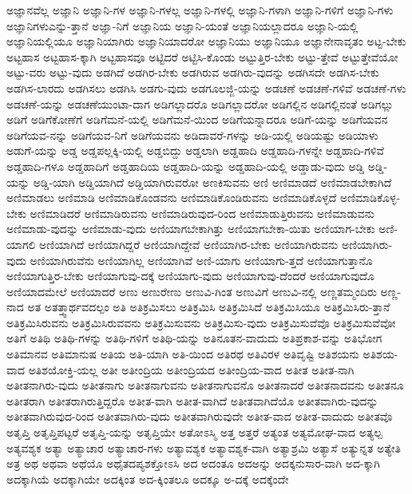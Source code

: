 {ಅಜ್ಞಾನವೆಲ್ಲ
ಅಜ್ಞಾನಿ
ಅಜ್ಞಾನಿ-ಗಳ
ಅಜ್ಞಾನಿ-ಗಳಲ್ಲ
ಅಜ್ಞಾನಿ-ಗಳಲ್ಲಿ
ಅಜ್ಞಾನಿ-ಗಳಾಗಿ
ಅಜ್ಞಾನಿ-ಗಳಿಗೆ
ಅಜ್ಞಾನಿ-ಗಳು
ಅಜ್ಞಾನಿಗಳುಎನ್ನು-ತ್ತಾನೆ
ಅಜ್ಞಾ-ನಿಗೆ
ಅಜ್ಞಾನಿಯ
ಅಜ್ಞಾನಿ-ಯಂತೆ
ಅಜ್ಞಾನಿಯಲ್ಲಾದರೂ
ಅಜ್ಞಾನಿ-ಯಲ್ಲಿ
ಅಜ್ಞಾನಿಯಲ್ಲಿಯೂ
ಅಜ್ಞಾನಿಯಾಗಿರು
ಅಜ್ಞಾನಿಯಾದರೋ
ಅಜ್ಞಾನಿಯು
ಅಜ್ಞಾನಿಯೂ
ಅಜ್ಞಾನೇನಾವೃತಂ
ಅಟ್ಟ-ಬೇಕು
ಅಟ್ಟಹಾಸ
ಅಟ್ಟಹಾಸ-ಕ್ಕಾಗಿ
ಅಟ್ಟಹಾಸವೂ
ಅಟ್ಟಿದರೆ
ಅಟ್ಟಿಸಿ-ಕೊಂಡು
ಅಟ್ಟುತ್ತಿರ-ಬೇಕು
ಅಟ್ಟು-ತ್ತೇವೆ
ಅಟ್ಟುತ್ತೇವೆಯೋ
ಅಟ್ಟು-ವರು
ಅಟ್ಟು-ವುದು
ಅಡಗಿದೆ
ಅಡಗಿರ-ಬೇಕು
ಅಡಗಿರುವ
ಅಡಗಿರು-ವುದನ್ನು
ಅಡಗಿಸದೇ
ಅಡಗಿಸ-ಬೇಕು
ಅಡಗಿಸ-ಲಾರದು
ಅಡಗಿಸಲು
ಅಡಗಿಸಿ
ಅಡಗು-ವುದು
ಅಡಗೂಲಜ್ಜಿ-ಯನ್ನು
ಅಡಚಣೆ
ಅಡಚಣೆ-ಗಳಿವೆ
ಅಡಚಣೆ-ಗಳು
ಅಡಚಣೆ-ಯನ್ನು
ಅಡಚಣೆಯುಂಟಾ-ದಾಗ
ಅಡಿಗಲ್ಲಾದರೊ
ಅಡಿಗಲ್ಲಾದರೋ
ಅಡಿಗಲ್ಲಿನ
ಅಡಿಗಲ್ಲಿನಂತೆ
ಅಡಿಗಲ್ಲು
ಅಡಿಗೆ
ಅಡಿಗೆಕೋಣೆಗೆ
ಅಡಿಗೆಮನೆ-ಯಲ್ಲಿ
ಅಡಿಗೆಮನೆ-ಯಿಂದ
ಅಡಿಗೆಯನ್ನಾದರೂ
ಅಡಿಗೆ-ಯನ್ನು
ಅಡಿಗೆಯವನ
ಅಡಿಗೆಯವ-ನನ್ನು
ಅಡಿಗೆಯವ-ನಿಗೆ
ಅಡಿಗೆಯವನು
ಅಡಿದಾವರೆ-ಗಳನ್ನು
ಅಡಿ-ಯಲ್ಲಿ
ಅಡಿಯಷ್ಟು
ಅಡಿಯಾಳು
ಅಡುಗೆ-ಯನ್ನು
ಅಡ್ಡ
ಅಡ್ಡಪಲ್ಲಕ್ಕಿ-ಯಲ್ಲಿ
ಅಡ್ಡಬಿದ್ದು
ಅಡ್ಡಲಾಗಿ
ಅಡ್ಡಹಾದಿ
ಅಡ್ಡಹಾದಿ-ಗಳನ್ನೇ
ಅಡ್ಡಹಾದಿ-ಗಳಿವೆ
ಅಡ್ಡಹಾದಿ-ಗಳೂ
ಅಡ್ಡಹಾದಿಗೆ
ಅಡ್ಡಹಾದಿಯ
ಅಡ್ಡಹಾದಿ-ಯನ್ನು
ಅಡ್ಡಹಾದಿ-ಯಲ್ಲಿ
ಅಡ್ಡಾಡು-ವುದು
ಅಡ್ಡಿ
ಅಡ್ಡಿ-ಯನ್ನು
ಅಡ್ಡಿ-ಯಾಗಿ
ಅಡ್ಡಿಯಾಗಿದೆ
ಅಡ್ಡಿಯಾಗಿರುವರೋ
ಅಣಕಿಸುವನು
ಅಣಿ
ಅಣಿಮಾಡದೆ
ಅಣಿಮಾಡಬೇಕಾಗಿದೆ
ಅಣಿಮಾಡಲು
ಅಣಿಮಾಡಿ
ಅಣಿಮಾಡಿಕೊಂಡವನು
ಅಣಿಮಾಡಿಕೊಂಡಿರುವನು
ಅಣಿಮಾಡಿಕೊಳ್ಳದೆ
ಅಣಿಮಾಡಿಕೊಳ್ಳ-ಬೇಕು
ಅಣಿಮಾಡಿದರೆ
ಅಣಿಮಾಡಿರುವನು
ಅಣಿಮಾಡಿರುವುದ-ರಿಂದ
ಅಣಿಮಾಡುತ್ತಿರುವನು
ಅಣಿಮಾಡುವನು
ಅಣಿಮಾಡು-ವುದನ್ನು
ಅಣಿಮಾಡು-ವುದು
ಅಣಿಯಾಗಬೇಕಾಗಿತ್ತು
ಅಣಿಯಾಗಬೇಕಾ-ಯಿತು
ಅಣಿಯಾಗ-ಬೇಕು
ಅಣಿ-ಯಾಗಲಿ
ಅಣಿಯಾಗಿದೆ
ಅಣಿಯಾಗಿದ್ದರೆ
ಅಣಿಯಾಗಿದ್ದೇವೆ
ಅಣಿಯಾಗಿರ-ಬೇಕು
ಅಣಿಯಾಗಿರುವನು
ಅಣಿಯಾಗಿರು-ವುದು
ಅಣಿಯಾಗಿರುವೆನು
ಅಣಿಯಾಗಿಲ್ಲ
ಅಣಿಯಾಗಿವೆ
ಅಣಿ-ಯಾಗು
ಅಣಿಯಾಗು-ತ್ತದೆ
ಅಣಿಯಾಗುತ್ತಾನೊ
ಅಣಿಯಾಗುತ್ತಿರ-ಬೇಕು
ಅಣಿಯಾಗುವು-ದಕ್ಕೆ
ಅಣಿಯಾಗು-ವುದು
ಅಣಿಯಾಗುವು-ದೆಂದರೆ
ಅಣಿಯಾಗುವುದೊ
ಅಣಿಯಾದಮೇಲೆ
ಅಣಿಯಾದರೆ
ಅಣು
ಅಣುರೇಣು
ಅಣುವಿ-ಗಿಂತ
ಅಣುವಿಗೆ
ಅಣುವಿ-ನಲ್ಲಿ
ಅಣ್ಣತಮ್ಮಂದಿರು
ಅಣ್ಣ-ನಾದ
ಅತ
ಅತತ್ತ್ವಾರ್ಥವದಲ್ಪಂ
ಅತಿ
ಅತಿಕ್ರಮಿಸಲು
ಅತಿಕ್ರಮಿಸಿ
ಅತಿಕ್ರಮಿಸಿದೆ
ಅತಿಕ್ರಮಿಸಿಯೂ
ಅತಿಕ್ರಮಿಸಿರು-ತ್ತಾನೆ
ಅತಿಕ್ರಮಿಸಿರುವನು
ಅತಿಕ್ರಮಿಸಿರುವವನು
ಅತಿಕ್ರಮಿಸುವನು
ಅತಿಕ್ರಮಿಸು-ವುದು
ಅತಿಕ್ರಮಿಸುವೆವೊ
ಅತಿಕ್ರಮಿಸುವೆವೋ
ಅತಿಗೆ
ಅತಿಥಿ
ಅತಿಥಿ-ಗಳನ್ನು
ಅತಿಥಿ-ಗಳಿಗೆ
ಅತಿಥಿ-ಯನ್ನು
ಅತಿನೂತನ-ವಾದುದು
ಅತಿಪ್ರಕಾಶ-ವನ್ನು
ಅತಿಭೋಗ
ಅತಿಮಾನವ
ಅತಿಮಾನುಷ
ಅತಿಯ
ಅತಿ-ಯಾಗಿ
ಅತಿ-ಯಿಂದ
ಅತಿರಥ
ಅತಿವಿರಳ
ಅತಿವೃಷ್ಟಿ
ಅತಿಶಯನು
ಅತಿಶಯ-ವಾದ
ಅತಿಶಯೋಕ್ತಿ-ಯಲ್ಲ
ಅತೀ
ಅತೀಂದ್ರಿಯ
ಅತೀಂದ್ರಿಯದ
ಅತೀಂದ್ರಿಯ-ವಾದ
ಅತೀತ
ಅತೀತ-ನಾಗಿ
ಅತೀತನಾಗಿರು-ವುದು
ಅತೀತನಾಗು
ಅತೀತನಾಗುವನು
ಅತೀತನಾಗುವನೊ
ಅತೀತನಾದರೆ
ಅತೀತನಾದವನು
ಅತೀತನೂ
ಅತೀತರಾಗಿ
ಅತೀತರಾಗಿರುತ್ತಿದ್ದರೊ
ಅತೀತ-ವಾಗಿ
ಅತೀತ-ವಾಗಿದೆ
ಅತೀತವಾಗಿದೆಯೊ
ಅತೀತವಾಗಿರು-ವುದನ್ನು
ಅತೀತವಾಗಿರುವುದ-ರಿಂದ
ಅತೀತವಾಗಿರು-ವುದು
ಅತೀತವಾಗಿರುವುದೇ
ಅತೀತ-ವಾದ
ಅತೀತ-ವಾದುದು
ಅತೀತವೊ
ಅತೃಪ್ತಿ
ಅತೃಪ್ತಿಪಟ್ಟರೆ
ಅತೃಪ್ತಿ-ಯನ್ನು
ಅತೃಪ್ತಿಯೇ
ಅತೋಽಸ್ಮಿ
ಅತ್ತ
ಅತ್ತರೆ
ಅತ್ಯಂತ
ಅತ್ಯಮೋಘ-ವಾದ
ಅತ್ಯಲ್ಪ
ಅತ್ಯವಶ್ಯಕ
ಅತ್ಯಾ
ಅತ್ಯಾಚಾರ
ಅತ್ಯಾಚಾರ-ಗಳು
ಅತ್ಯಾವಶ್ಯಕ
ಅತ್ಯಾವಶ್ಯಕ-ವಾಗಿ
ಅತ್ಯಾಶ್ರಮಿ
ಅತ್ಯಾಸೆ
ಅತ್ಯುನ್ನತ
ಅತ್ಯೇತಿ
ಅತ್ರ
ಅಥ
ಅಥವಾ
ಅಥೆಯೊ
ಅಥೈತದಪ್ಯಶಕ್ತೋಽಸಿ
ಅದ
ಅದಂತೂ
ಅದಅನ್ನು
ಅದಕ್ಕನುಸಾರ-ವಾಗಿ
ಅದ-ಕ್ಕಾಗಿ
ಅದಕ್ಕಾಗಿಯೆ
ಅದಕ್ಕಾಗಿಯೇ
ಅದಕ್ಕಿಂತ
ಅದ-ಕ್ಕಿಂತಲೂ
ಅದಕ್ಕೂ
ಅ-ದಕ್ಕೆ
ಅದಕ್ಕೆಂದೇ
}
